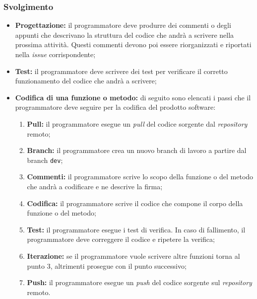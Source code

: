 \subsubsection{Svolgimento}
\begin{itemize}
	\item \textbf{Progettazione:} il programmatore deve produrre dei commenti o
	      degli appunti che descrivano la struttura del codice che andrà a
	      scrivere nella prossima attività. Questi commenti devono poi essere
	      riorganizzati e riportati nella \textit{issue\g} corrispondente;

	\item \textbf{Test:} il programmatore deve scrivere dei test per verificare
	      il corretto funzionamento del codice che andrà a scrivere;

	\item \textbf{Codifica di una funzione o metodo:} di seguito sono elencati i
	      passi che il programmatore deve seguire per la codifica del prodotto
	      software:
	      \begin{enumerate}
		      \item \textbf{Pull:} il programmatore esegue un \textit{pull} del
		            codice sorgente dal \textit{repository\g} remoto;

		      \item \textbf{Branch:} il programmatore crea un nuovo branch di
		            lavoro a partire dal branch \texttt{dev};

		      \item \textbf{Commenti:} il programmatore scrive lo scopo della
		            funzione o del metodo che andrà a codificare e ne descrive
		            la firma;

		      \item \textbf{Codifica:} il programmatore scrive il codice che
		            compone il corpo della funzione o del metodo;

		      \item \textbf{Test:} il programmatore esegue i test di verifica.
		            In caso di fallimento, il programmatore deve correggere il
		            codice e ripetere la verifica;

		      \item \textbf{Iterazione:} se il programmatore vuole scrivere
		            altre funzioni torna al punto 3, altrimenti prosegue
		            con il punto successivo;

		      \item \textbf{Push:} il programmatore esegue un \textit{push}
		            del codice sorgente sul \textit{repository\g} remoto.


\end{enumerate}
\end{itemize}
